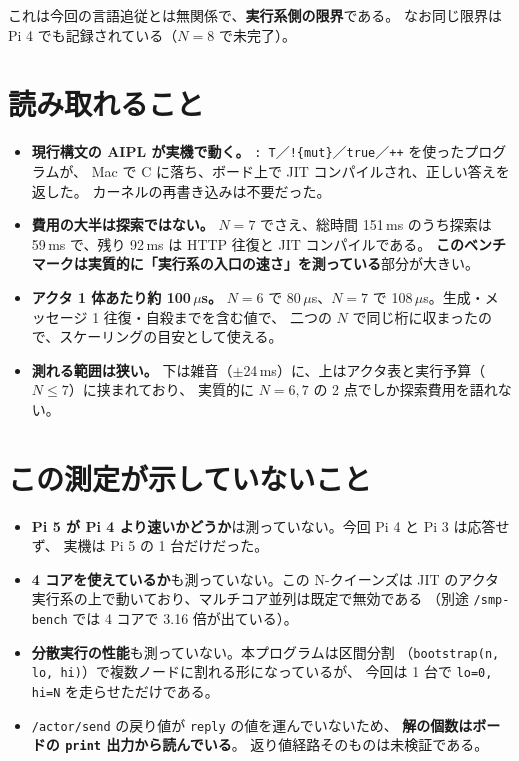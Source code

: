 \documentclass[11pt,a4paper]{ltjsarticle}
\newcommand{\code}[1]{\texttt{\small #1}}
\begin{document}
これは今回の言語追従とは無関係で、\textbf{実行系側の限界}である。
なお同じ限界は Pi 4 でも記録されている（$N=8$ で未完了）。

\section{読み取れること}

\begin{itemize}
\item \textbf{現行構文の AIPL が実機で動く。}
\code{: T}／\code{!\{mut\}}／\code{true}／\code{++} を使ったプログラムが、
Mac で C に落ち、ボード上で JIT コンパイルされ、正しい答えを返した。
カーネルの再書き込みは不要だった。

\item \textbf{費用の大半は探索ではない。}
$N=7$ でさえ、総時間 151\,ms のうち探索は 59\,ms で、残り 92\,ms は
HTTP 往復と JIT コンパイルである。
\textbf{このベンチマークは実質的に「実行系の入口の速さ」を測っている}部分が大きい。

\item \textbf{アクタ 1 体あたり約 100\,$\mu$s。}
$N=6$ で 80\,$\mu$s、$N=7$ で 108\,$\mu$s。生成・メッセージ 1 往復・自殺までを含む値で、
二つの $N$ で同じ桁に収まったので、スケーリングの目安として使える。

\item \textbf{測れる範囲は狭い。}
下は雑音（$\pm$24\,ms）に、上はアクタ表と実行予算（$N\le 7$）に挟まれており、
実質的に $N=6,7$ の 2 点でしか探索費用を語れない。
\end{itemize}

\section{この測定が示していないこと}

\begin{itemize}
\item \textbf{Pi 5 が Pi 4 より速いかどうか}は測っていない。今回 Pi 4 と Pi 3 は応答せず、
実機は Pi 5 の 1 台だけだった。
\item \textbf{4 コアを使えているか}も測っていない。この N-クイーンズは
JIT のアクタ実行系の上で動いており、マルチコア並列は既定で無効である
（別途 \code{/smp-bench} では 4 コアで 3.16 倍が出ている）。
\item \textbf{分散実行の性能}も測っていない。本プログラムは区間分割
（\code{bootstrap(n, lo, hi)}）で複数ノードに割れる形になっているが、
今回は 1 台で \code{lo=0, hi=N} を走らせただけである。
\item \code{/actor/send} の戻り値が \code{reply} の値を運んでいないため、
\textbf{解の個数はボードの \code{print} 出力から読んでいる}。
返り値経路そのものは未検証である。
\end{itemize}
\end{document}
